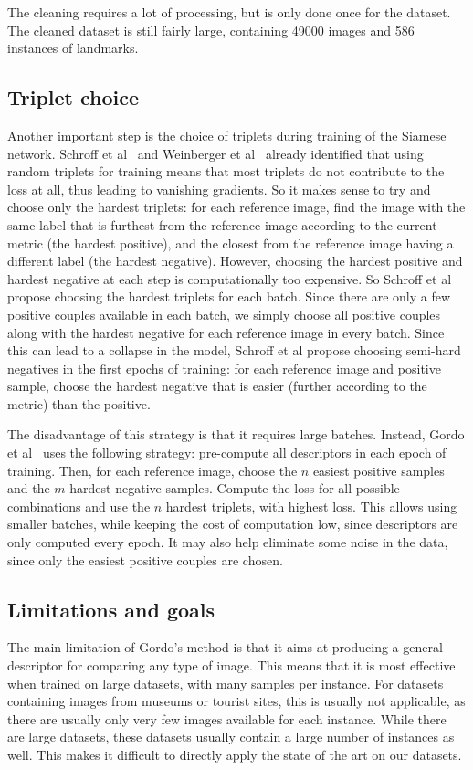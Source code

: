 The cleaning requires a lot of processing,
but is only done once for the dataset.
The cleaned dataset is still fairly large, containing 49000 images and
586 instances of landmarks.

\subsection{Triplet choice}
Another important step is the choice of triplets during training of
the Siamese network. Schroff et al~\cite{schroff_facenet:_2015}
and Weinberger et al~\cite{weinberger_distance_2006} already identified
that using random triplets for training means that most triplets do not
contribute to the loss at all, thus leading to vanishing gradients.
So it makes sense to try and choose only the hardest triplets: for each
reference image, find the image with the same label that is furthest from the
reference image according to the current metric (the hardest positive),
and the closest from the reference image having a different label
(the hardest negative).
However, choosing the hardest positive and hardest negative at each step
is computationally too expensive. So Schroff et al~\cite{schroff_facenet:_2015}
propose choosing the hardest triplets for each batch. Since there are only
a few positive couples available in each batch, we simply choose all
positive couples along with the hardest negative for each reference image
in every batch. Since this can lead to a collapse in the model, Schroff
et al propose choosing semi-hard negatives in the first epochs of
training: for each reference image and positive sample, choose the hardest
negative that is easier (further according to the metric) than the positive.

The disadvantage of this strategy is that it requires large batches.
Instead, Gordo et al~\cite{gordo_end--end_2016} uses the following
strategy: pre-compute all descriptors in each epoch of training.
Then, for each reference image, choose the $n$ easiest positive samples
and the $m$ hardest negative samples. Compute the loss for all possible
combinations and use the $n$ hardest triplets, with highest loss.
This allows using smaller batches, while keeping the cost of computation
low, since descriptors are only computed every epoch. It may also help
eliminate some noise in the data, since only the easiest positive couples
are chosen.

\subsection{Limitations and goals}
The main limitation of Gordo's method is that it aims at producing a
general descriptor for comparing any type of image. This means that it
is most effective when trained on large datasets, with many samples
per instance. For datasets containing images from museums or tourist
sites, this is usually not applicable, as there are usually only very few
images available for each instance. While there are large datasets,
these datasets usually contain a large number of instances as well.
This makes it difficult to directly apply the state of the art on
our datasets.


